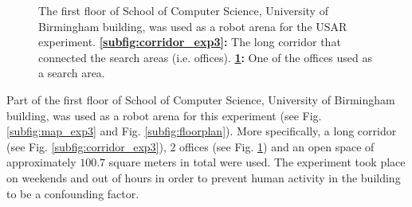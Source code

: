 \documentclass[a4paper,12pt,oneside,openright]{bhamthesis}
\begin{document}
\begin{figure}
\begin{subfigure}[b]{0.65\textwidth}
			\caption{}
			\label{subfig:office_exp3}
		\end{subfigure}
		\hfill
		\caption{The first floor of School of Computer Science, University of Birmingham building, was used as a robot arena for the USAR experiment. \textbf{\ref{subfig:corridor_exp3}:} The long corridor that connected the search areas (i.e. offices). \textbf{\ref{subfig:office_exp3}:} One of the offices used as a search area.}
		\label{fig:cs_arena_exp3}
	\end{figure}

Part of the first floor of School of Computer Science, University of Birmingham building, was used as a robot arena for this experiment (see Fig. \ref{subfig:map_exp3} and Fig. \ref{subfig:floorplan}). More specifically, a long corridor (see Fig. \ref{subfig:corridor_exp3}), 2 offices (see Fig. \ref{subfig:office_exp3}) and an open space of approximately $100.7$ square meters in total were used. The experiment took place on weekends and out of hours in order to prevent human activity in the building to be a confounding factor. 
\end{document}
